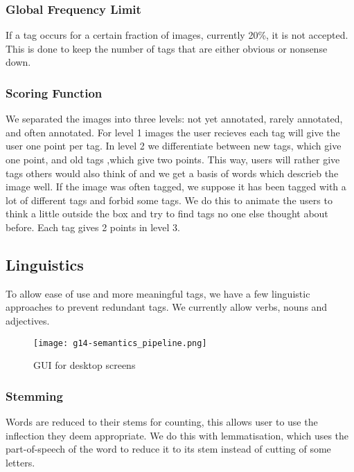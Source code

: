 \subsubsection{Global Frequency Limit}
\label{g14:sec:concepts:spamprevention:frequencylimit}
If a tag occurs for a certain fraction of images, currently 20\%, it is not accepted. This is done to keep the number of tags that are either obvious or nonsense down.

\subsubsection{Scoring Function}
\label{g14:sec:concepts:spamprevention:scoringfunction}
We separated the images into three levels: not yet annotated, rarely annotated, and often annotated. For level 1 images the user recieves each tag will give the user one point per tag. In level 2 we differentiate between new tags, which give one point, and old tags ,which give two points. This way, users will rather give tags others would also think of and we get a basis of words which descrieb the image well. If the image was often tagged, we suppose it has been tagged with a lot of different tags and forbid some tags. We do this to animate the users to think a little outside the box and try to find tags no one else thought about before. Each tag gives 2 points in level 3.


\subsection{Linguistics}
\label{g14:sec:concepts:linguistics}
To allow ease of use and more meaningful tags, we have a few linguistic approaches to prevent redundant tags. We currently allow verbs, nouns and adjectives.

\begin{figure}[tb]
	\centering
	\texttt{[image: g14-semantics\_pipeline.png]}
	\caption{GUI for desktop screens}
	\label{fig:guiclassicdesktop}
\end{figure}



\subsubsection{Stemming}
\label{g14:sec:concepts:linguistics:stemming}
Words are reduced to their stems for counting, this allows user to use the inflection they deem appropriate. We do this with lemmatisation, which uses the part-of-speech of the word to reduce it to its stem instead of cutting of some letters.


